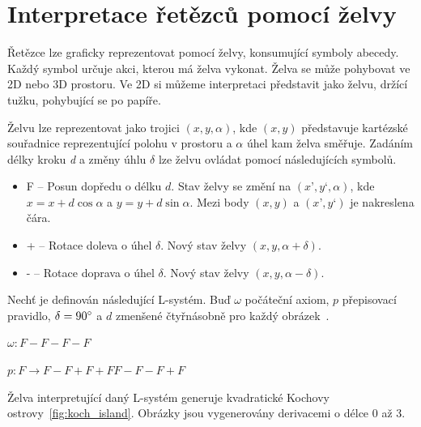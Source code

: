\documentclass[thesis=M,czech]{FITthesis}[2019/12/23]
\begin{document}
\section{Interpretace řetězců pomocí želvy}
Řetězce lze graficky reprezentovat pomocí želvy, konsumující symboly abecedy. Každý symbol určuje akci, kterou má želva vykonat. Želva se může pohybovat ve 2D nebo 3D prostoru. Ve 2D si můžeme interpretaci představit jako želvu, držící tužku, pohybující se po papíře.

Želvu lze reprezentovat jako trojici $(x, y, \alpha)$, kde $(x, y)$ představuje kartézské souřadnice reprezentující polohu v prostoru a $\alpha$ úhel kam želva směřuje. Zadáním délky kroku \textit{d} a změny úhlu $\delta$ lze želvu ovládat pomocí následujících symbolů.

\begin{itemize}
\item F -- Posun dopředu o délku $d$. Stav želvy se změní na $(x’, y‘, \alpha)$, kde $x = x + d \cos \alpha$ a $y = y + d \sin \alpha$. Mezi body $(x, y)$ a $(x’, y‘)$ je nakreslena čára.
\item + -- Rotace doleva o úhel $\delta$. Nový stav želvy $(x, y, \alpha + \delta)$.
\item - -- Rotace doprava o úhel $\delta$. Nový stav želvy $(x, y, \alpha - \delta)$.
\end{itemize}

Nechť je definován následující L-systém. Buď $\omega$ počáteční axiom, $p$ přepisovací pravidlo, $\delta = 90\degree$ a $d$ zmenšené čtyřnásobně pro každý obrázek~\cite{abop7}.

\bigskip
$\omega: F-F-F-F$

\medskip
$p: F \rightarrow F-F+F+FF-F-F+F$

\bigskip
Želva interpretující daný L-systém generuje kvadratické Kochovy ostrovy~\ref{fig:koch_island}. Obrázky jsou vygenerovány derivacemi o délce 0 až 3.
\end{document}
